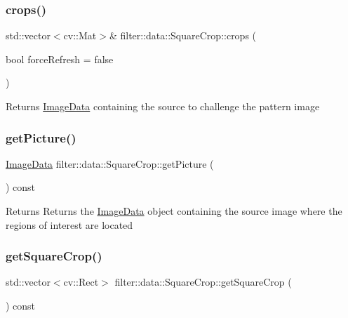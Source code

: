 \subsubsection{\texorpdfstring{crops()}{crops()}}
{\footnotesize\ttfamily std\+::vector$<$cv\+::\+Mat$>$\& filter\+::data\+::\+Square\+Crop\+::crops (\begin{DoxyParamCaption}\item[{bool}]{force\+Refresh = {\ttfamily false} }\end{DoxyParamCaption})\hspace{0.3cm}{\ttfamily [inline]}}

\begin{DoxyReturn}{Returns}
\hyperlink{classfilter_1_1data_1_1_image_data}{Image\+Data} containing the source to challenge the pattern image 
\end{DoxyReturn}
\mbox{\label{classfilter_1_1data_1_1_square_crop_a97b9cd82a00fb0d4a314f95010726344}} 
\subsubsection{\texorpdfstring{get\+Picture()}{getPicture()}}
{\footnotesize\ttfamily \hyperlink{classfilter_1_1data_1_1_image_data}{Image\+Data} filter\+::data\+::\+Square\+Crop\+::get\+Picture (\begin{DoxyParamCaption}{ }\end{DoxyParamCaption}) const\hspace{0.3cm}{\ttfamily [inline]}}

\begin{DoxyReturn}{Returns}
Returns the \hyperlink{classfilter_1_1data_1_1_image_data}{Image\+Data} object containing the source image where the regions of interest are located 
\end{DoxyReturn}
\mbox{\label{classfilter_1_1data_1_1_square_crop_ac0a29b6c8ac9a87cb14c8a19a89eb359}} 
\subsubsection{\texorpdfstring{get\+Square\+Crop()}{getSquareCrop()}}
{\footnotesize\ttfamily std\+::vector$<$cv\+::\+Rect$>$ filter\+::data\+::\+Square\+Crop\+::get\+Square\+Crop (\begin{DoxyParamCaption}{ }\end{DoxyParamCaption}) const\hspace{0.3cm}{\ttfamily [inline]}}

